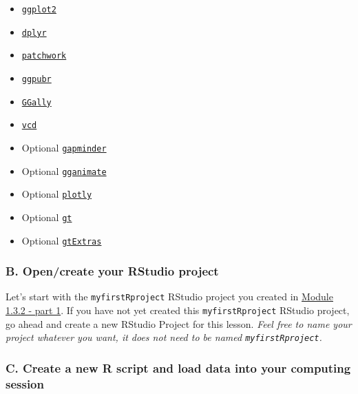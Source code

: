 \documentclass[
  letterpaper,
  DIV=11,
  numbers=noendperiod]{scrartcl}
\providecommand{\tightlist}{%
  \setlength{\itemsep}{0pt}\setlength{\parskip}{0pt}}\usepackage{longtable,booktabs,array}
\begin{document}
\begin{itemize}
\tightlist
\item
  \href{https://cloud.r-project.org/web/packages/ggplot2/}{\texttt{ggplot2}}
\item
  \href{https://cloud.r-project.org/web/packages/dplyr/}{\texttt{dplyr}}
\item
  \href{https://cran.r-project.org/web/packages/patchwork/}{\texttt{patchwork}}
\item
  \href{https://cran.r-project.org/web/packages/ggpubr/}{\texttt{ggpubr}}
\item
  \href{https://cran.r-project.org/web/packages/GGally/}{\texttt{GGally}}
\item
  \href{https://cran.r-project.org/web/packages/vcd/}{\texttt{vcd}}
\item
  Optional
  \href{https://cran.r-project.org/web/packages/gapminder/}{\texttt{gapminder}}
\item
  Optional
  \href{https://cran.r-project.org/web/packages/gganimate/}{\texttt{gganimate}}
\item
  Optional
  \href{https://cran.r-project.org/web/packages/plotly/}{\texttt{plotly}}
\item
  Optional
  \href{https://cran.r-project.org/web/packages/gt/}{\texttt{gt}}
\item
  Optional
  \href{https://cran.r-project.org/web/packages/gtExtras/}{\texttt{gtExtras}}
\end{itemize}

\subsubsection{B. Open/create your RStudio
project}\label{b.-opencreate-your-rstudio-project}

Let's start with the \texttt{myfirstRproject} RStudio project you
created in
\href{module132_DataWrangling.html\#begin-with-a-new-rstudio-project}{Module
1.3.2 - part 1}. If you have not yet created this
\texttt{myfirstRproject} RStudio project, go ahead and create a new
RStudio Project for this lesson. \emph{Feel free to name your project
whatever you want, it does not need to be named
\texttt{myfirstRproject}.}

\subsubsection{C. Create a new R script and load data into your
computing
session}\label{c.-create-a-new-r-script-and-load-data-into-your-computing-session}
\end{document}
